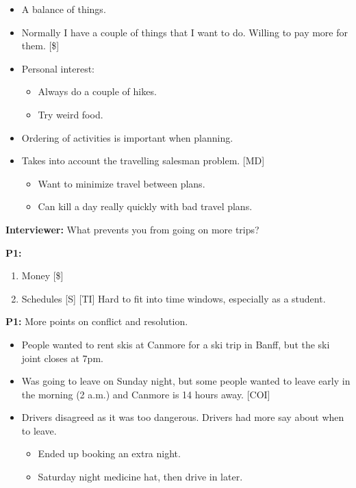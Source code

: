 \documentclass[12pt,a4paper]{article}
\begin{document}
\begin{itemize}
    \item A balance of things. 
    \item Normally I have a couple of things that I want to do.
Willing to pay more for them. [\$]

    \item Personal interest: 
    \begin{itemize}
        \item Always do a couple of hikes. 
        \item Try weird food. 
    \end{itemize}
    \item Ordering of activities is important when planning.
    \item Takes into account the travelling salesman problem. [MD]
    \begin{itemize}
        \item Want to minimize travel between plans.
        \item Can kill a day really quickly with bad travel plans. 
    \end{itemize}
\end{itemize}

\textbf{Interviewer:} What prevents you from going on more trips?

\textbf{P1:}

\begin{enumerate}
    \item Money [\$]
    \item Schedules [S] [TI]
Hard to fit into time windows, especially as a student.

\end{enumerate}

\textbf{P1: }More points on conflict and resolution. 

\begin{itemize}
    \item People wanted to rent skis at Canmore for a ski trip in Banff, but the ski joint closes at 7pm. 
    \item Was going to leave on Sunday night, but some people wanted to leave early in the morning (2 a.m.) and Canmore is 14 hours away. [COI]
    \item Drivers disagreed as it was too dangerous. Drivers had more say about when to leave. 
    \begin{itemize}
        \item Ended up booking an extra night.
        \item Saturday night medicine hat, then drive in later. 
    \end{itemize}
\end{itemize}
\end{document}
